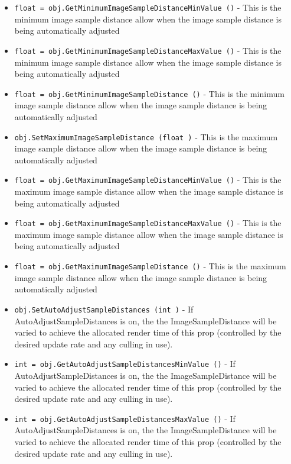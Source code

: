 \begin{itemize}
\item  \verb|float = obj.GetMinimumImageSampleDistanceMinValue ()| -  This is the minimum image sample distance allow when the image
 sample distance is being automatically adjusted

\item  \verb|float = obj.GetMinimumImageSampleDistanceMaxValue ()| -  This is the minimum image sample distance allow when the image
 sample distance is being automatically adjusted

\item  \verb|float = obj.GetMinimumImageSampleDistance ()| -  This is the minimum image sample distance allow when the image
 sample distance is being automatically adjusted

\item  \verb|obj.SetMaximumImageSampleDistance (float )| -  This is the maximum image sample distance allow when the image
 sample distance is being automatically adjusted

\item  \verb|float = obj.GetMaximumImageSampleDistanceMinValue ()| -  This is the maximum image sample distance allow when the image
 sample distance is being automatically adjusted

\item  \verb|float = obj.GetMaximumImageSampleDistanceMaxValue ()| -  This is the maximum image sample distance allow when the image
 sample distance is being automatically adjusted

\item  \verb|float = obj.GetMaximumImageSampleDistance ()| -  This is the maximum image sample distance allow when the image
 sample distance is being automatically adjusted

\item  \verb|obj.SetAutoAdjustSampleDistances (int )| -  If AutoAdjustSampleDistances is on, the the ImageSampleDistance
 will be varied to achieve the allocated render time of this 
 prop (controlled by the desired update rate and any culling in
 use). 

\item  \verb|int = obj.GetAutoAdjustSampleDistancesMinValue ()| -  If AutoAdjustSampleDistances is on, the the ImageSampleDistance
 will be varied to achieve the allocated render time of this 
 prop (controlled by the desired update rate and any culling in
 use). 

\item  \verb|int = obj.GetAutoAdjustSampleDistancesMaxValue ()| -  If AutoAdjustSampleDistances is on, the the ImageSampleDistance
 will be varied to achieve the allocated render time of this 
 prop (controlled by the desired update rate and any culling in
 use). 


\end{itemize}
